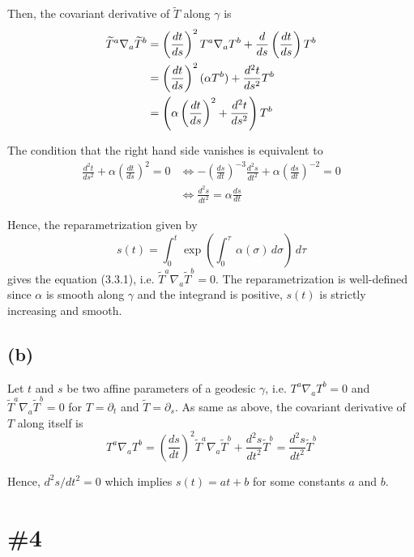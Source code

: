 \documentclass[a4paper,11pt]{article}
\begin{document}
Then, the covariant derivative of $\widetilde{T}$ along $\gamma$ is
\begin{align}
    \widetilde{T}^a\nabla_a \widetilde{T}^b &= \left(\frac{dt}{ds}\right)^2 T^a\nabla_a T^b + \frac{d}{ds} \left(\frac{dt}{ds}\right) T^b \notag\\
    &= \left(\frac{dt}{ds}\right)^2 (\alpha T^b) + \frac{d^2t}{ds^2}T^b\notag\\
    &= \left(\alpha\left(\frac{dt}{ds}\right)^2 + \frac{d^2 t}{ds^2}\right) T^b
\end{align}

The condition that the right hand side vanishes is equivalent to
\begin{align}
    \frac{d^2 t}{ds^2} + \alpha\left(\frac{dt}{ds}\right)^2 = 0
    &\iff -\left(\frac{ds}{dt}\right)^{-3}\frac{d^2 s}{dt^2} + \alpha\left(\frac{ds}{dt}\right)^{-2} = 0\\
    &\iff \frac{d^2 s}{dt^2} = \alpha \frac{ds}{dt}
\end{align}


Hence, the reparametrization given by 
\begin{equation}
    s(t) = \int_0^t \exp\left(\int_0^\tau \,\alpha(\sigma)\,d\sigma\right)\, d\tau
\end{equation}
gives the equation (3.3.1), i.e. $\widetilde{T}^a\nabla_a \widetilde{T}^b = 0$. The reparametrization is well-defined since $\alpha$ is smooth along $\gamma$ and the integrand is positive, $s(t)$ is strictly increasing and smooth.




\subsection{(b)}

Let $t$ and $s$ be two affine parameters of a geodesic $\gamma$, i.e. $T^a\nabla_a T^b = 0$ and $\widetilde{T}^a\nabla_a \widetilde{T}^b = 0$ for $T = \partial_t$ and $\widetilde{T} = \partial_s$. As same as above, the covariant derivative of $T$ along itself is
\begin{equation}
    T^a\nabla_a T^b = \left(\frac{ds}{dt}\right)^2 \widetilde{T}^a\nabla_a \widetilde{T}^b + \frac{d^2 s}{dt^2} \widetilde{T}^b = \frac{d^2 s}{dt^2} \widetilde{T}^b
\end{equation}

Hence, $d^2 s/dt^2 = 0$ which implies $s(t) = a t + b$ for some constants $a$ and $b$.


\section{\#4}
\end{document}
